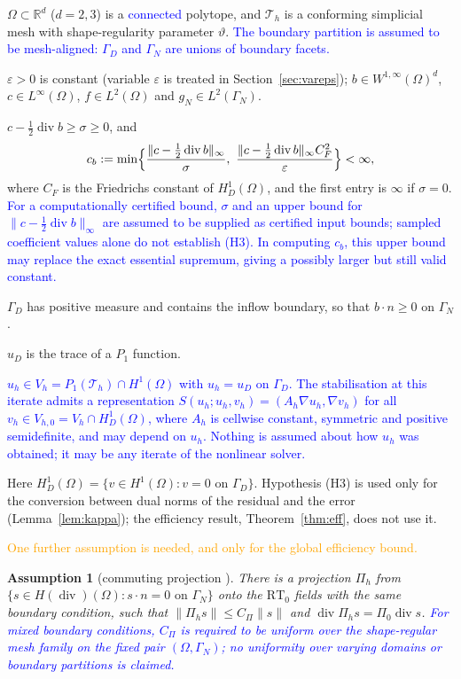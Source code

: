 \documentclass[11pt]{article}
\newcommand{\rev}[1]{\textcolor{blue}{#1}}
\newcommand{\refe}[1]{\textcolor{orange}{#1}}   %
\newcommand{\eps}{\varepsilon}
\newcommand{\RT}{\mathrm{RT}}
\newcommand{\Hdiv}{H(\operatorname{div})}
\newcommand{\dv}{\operatorname{div}}
\theoremstyle{plain}
\newtheorem{assumption}[theorem]{Assumption}
\theoremstyle{remark}
\numberwithin{equation}{section}
\begin{document}
\begin{description}[leftmargin=3.2em,style=nextline]
  \item[(H1)] $\Omega\subset\mathbb{R}^d$ ($d=2,3$) is a \rev{connected} polytope, and $\mathcal T_h$ is a
  conforming simplicial mesh with shape-regularity parameter $\vartheta$. \rev{The boundary partition
  is assumed to be mesh-aligned: $\Gamma_D$ and $\Gamma_N$ are unions of boundary facets.}
  \item[(H2)] $\eps>0$ is constant (variable $\eps$ is treated in Section~\ref{sec:vareps});
  $b\in W^{1,\infty}(\Omega)^d$, $c\in L^\infty(\Omega)$, $f\in L^2(\Omega)$ and
  $g_N\in L^2(\Gamma_N)$.
  \item[(H3)] $c-\tfrac12\dv b\ge\sigma\ge 0$, and
  \[
    c_b:=\min\Bigl\{\frac{\|c-\tfrac12\dv b\|_\infty}{\sigma},\
    \frac{\|c-\tfrac12\dv b\|_\infty C_F^2}{\eps}\Bigr\}<\infty,
  \]
  where $C_F$ is the Friedrichs constant of $H^1_D(\Omega)$, and the first entry is $\infty$ if
  $\sigma=0$. \rev{For a computationally certified bound, $\sigma$ and an upper bound for
  $\|c-\tfrac12\dv b\|_\infty$ are assumed to be supplied as certified input bounds; sampled
  coefficient values alone do not establish (H3). In computing $c_b$, this upper bound may replace
  the exact essential supremum, giving a possibly larger but still valid constant.}
  \item[(H4)] $\Gamma_D$ has positive measure and contains the inflow boundary, so that
  $b\cdot n\ge 0$ on $\Gamma_N$.
  \item[(H5)] $u_D$ is the trace of a $P_1$ function.
  \item[(H6)] \rev{$u_h\in V_h=P_1(\mathcal T_h)\cap H^1(\Omega)$ with $u_h=u_D$ on $\Gamma_D$. The
  stabilisation at this iterate admits a representation
  $S(u_h;u_h,v_h)=(A_h\nabla u_h,\nabla v_h)$ for all
  $v_h\in V_{h,0}=V_h\cap H^1_D(\Omega)$, where $A_h$ is cellwise constant, symmetric and positive
  semidefinite, and may depend on $u_h$. Nothing is assumed about how $u_h$ was obtained; it may be
  any iterate of the nonlinear solver.}
\end{description}
Here $H^1_D(\Omega)=\{v\in H^1(\Omega):v=0\text{ on }\Gamma_D\}$. Hypothesis (H3) is used only for
the conversion between dual norms of the residual and the error (Lemma~\ref{lem:kappa}); the
efficiency result, Theorem~\ref{thm:eff}, does not use it.

\refe{One further assumption is needed, and only for the global efficiency bound.}

\begin{assumption}[commuting projection \cite{CW08,Licht19}]\label{tool:A5}
There is a projection $\Pi_h$ from $\{s\in\Hdiv(\Omega):s\cdot n=0\text{ on }\Gamma_N\}$ onto the
$\RT_0$ fields with the same boundary condition, such that
$\|\Pi_hs\|\le C_\Pi\|s\|$ and $\dv\Pi_hs=\Pi_0\dv s$. \rev{For mixed boundary conditions,
$C_\Pi$ is required to be uniform over the shape-regular mesh family on the fixed pair
$(\Omega,\Gamma_N)$; no uniformity over varying domains or boundary partitions is claimed.}
\end{assumption}
\end{document}
